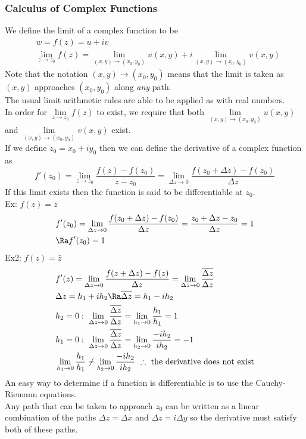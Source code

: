 \subsubsection{Calculus of Complex Functions}
We define the limit of a complex function to be
\begin{align*}
    &w=f(z)=u+iv\\
    &\lim_{z\to z_0}f(z)=\lim_{(x,y)\to(x_0,y_0)}u(x,y)+i\lim_{(x,y)\to(x_0,y_0)}v(x,y)
\end{align*}
Note that the notation $(x,y)\to(x_0,y_0)$ means that the limit is taken as $(x,y)$ approaches $(x_0,y_0)$ along \textit{any} path.\\
The usual limit arithmetic rules are able to be applied as with real numbers.\\
In order for
$\lim\limits_{z\to z_0}f(z)$
to exist, we require that both $\lim\limits_{(x,y)\to(x_0,y_0)}u(x,y)$ and $\lim\limits_{(x,y)\to(x_0,y_0)}v(x,y)$ exist.\\
If we define $z_0=x_0+iy_0$ then we can define the derivative of a complex function as
$$f'(z_0)=\lim_{z\to z_0}\frac{f(z)-f(z_0)}{z-z_0}=\lim_{\Delta z\to0}\frac{f(z_0+\Delta z)-f(z_0)}{\Delta z}$$
If this limit exists then the function is said to be differentiable at $z_0$.\\
Ex: $f(z)=z$
\begin{align*}
    &f'(z_0)=\lim_{\Delta z\to0}\frac{f(z_0+\Delta z)-f(z_0)}{\Delta z}=\frac{z_0+\Delta z-z_0}{\Delta z}=1\\
    &\Ra f'(z_0)=1
\end{align*}
Ex2: $f(z)=\bar{z}$
\begin{align*}
    &f'(z)=\lim_{\Delta z\to0}\frac{f(z+\Delta z)-f(z)}{\Delta z}=\lim_{\Delta z\to0}\frac{\overline{\Delta z}}{\Delta z}\\
    &\Delta z=h_1+ih_2\Ra \overline{\Delta z}=h_1-ih_2\\
    &h_2=0:\ \lim_{\Delta z\to0}\frac{\overline{\Delta z}}{\Delta z}=\lim_{h_1\to0}\frac{h_1}{h_1}=1\\
    &h_1=0:\ \lim_{\Delta z\to0}\frac{\overline{\Delta z}}{\Delta z}=\lim_{h_2\to0}\frac{-ih_2}{ih_2}=-1\\
    &\lim_{h_1\to0}\frac{h_1}{h_1}\neq\lim_{h_2\to0}\frac{-ih_2}{ih_2}\ \therefore\text{ the derivative does not exist}
\end{align*}
An easy way to determine if a function is differentiable is to use the Cauchy-Riemann equations.\\
Any path that can be taken to approach $z_0$ can be written as a linear combination of the paths $\Delta z=\Delta x$ and $\Delta z = i\Delta y$ so the derivative must satisfy both of these paths.

